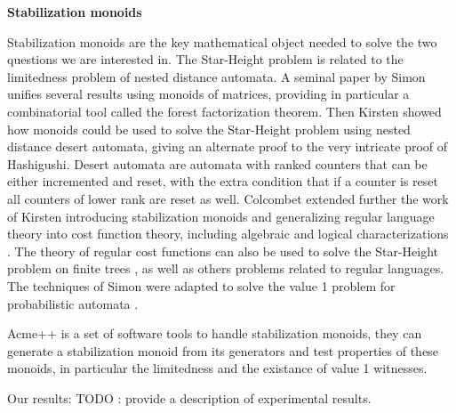 \textbf{Stabilization monoids}

Stabilization monoids are the key mathematical object needed to solve the two questions we are interested in.
The Star-Height problem is related to the limitedness problem of nested distance automata.
A seminal paper by Simon \cite{Sim94} unifies several results using monoids of matrices, providing in particular a combinatorial tool called the forest factorization theorem. 
Then Kirsten showed how monoids could be used to solve the Star-Height problem using nested distance desert automata,
giving an alternate proof to the very intricate proof of Hashigushi.
Desert automata are automata with ranked counters that can be either incremented and reset,
with the extra condition that if a counter is reset all counters of lower rank are reset as well.
Colcombet extended further the work of Kirsten introducing stabilization monoids and generalizing regular language theory into cost function theory, including algebraic and logical characterizations \cite{Colcombet09,CKL10,Kup14}. The theory of regular cost functions can also be used to solve the Star-Height problem on finite trees \cite{CL08sh}, as well as others problems related to regular languages.
The techniques of Simon were adapted to solve the value 1 problem for probabilistic automata \cite{FGO12}.


Acme++ is a set of software tools to handle stabilization monoids, they can generate a stabilization monoid from its generators and test properties of these monoids, in particular the limitedness and the existance of value 1 witnesses.

Our results:
TODO : provide a description of experimental results.